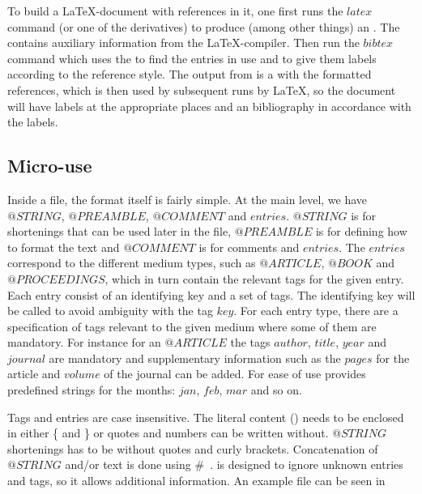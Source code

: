 To build a {\LaTeX}-document with {\bibtex} references in it, one
first runs the $latex$ command (or one of the derivatives) to produce
(among other things) an .  The  contains auxiliary
information from the {\LaTeX}-compiler.  Then run the $bibtex$ command
which uses the  to find the entries in use and to give them
labels according to the reference style.  The output from {\bibtex} is
a  with the formatted references, which is then used by
subsequent runs by {\LaTeX}, so the document will have labels at the
appropriate places and an bibliography in accordance with the labels.


\subsection{Micro-use}

Inside a {\bibtex} file, the format itself is fairly simple. At the
main level, we have $@STRING$, $@PREAMBLE$, $@COMMENT$ and $entries$.
$@STRING$ is for shortenings that can be used later in the {\bibtex}
file, $@PREAMBLE$ is for defining how to format the text and
$@COMMENT$ is for comments and $entries$.  The $entries$ correspond to
the different medium types, such as $@ARTICLE$, $@BOOK$ and
$@PROCEEDINGS$, which in turn contain the relevant tags for the given
entry.  Each entry consist of an identifying key and a set of tags.
The identifying key will be called  to avoid
ambiguity with the tag $key$.  For each entry type, there are a
specification of tags relevant to the given medium where some of them
are mandatory. For instance for an $@ARTICLE$ the tags $author$,
$title$, $year$ and $journal$ are mandatory and supplementary
information such as the $pages$ for the article and $volume$ of the
journal can be added.  For ease of use {\bibtex} provides predefined
strings for the months: $jan$, $feb$, $mar$ and so on.

Tags and entries are case insensitive. The literal content
() needs to be enclosed in either \{ and \} or quotes and
numbers can be written without.  $@STRING$ shortenings has to be
without quotes and curly brackets.  Concatenation of $@STRING$ and/or
text is done using \#~\cite{bibtex_resource}.  {\bibtex} is designed
to ignore unknown entries and tags, so it allows additional
information.  An example {\bibtex} file can be seen in

